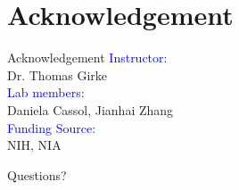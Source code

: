 \documentclass[10pt]{beamer}
\begin{document}
\section{Acknowledgement}
\begin{frame}{Acknowledgement}
\vspace{-1.6cm}
\textcolor{blue}{Instructor:} \\
Dr. Thomas Girke \\
\vspace{0.6cm}
\textcolor{blue}{Lab members:} \\
Daniela Cassol, Jianhai Zhang \\
\vspace{0.6cm}
\textcolor{blue}{Funding Source:} \\ 
NIH, NIA
\end{frame}
\begin{frame}[standout]
  Questions?
\end{frame}
\appendix
\end{document}
